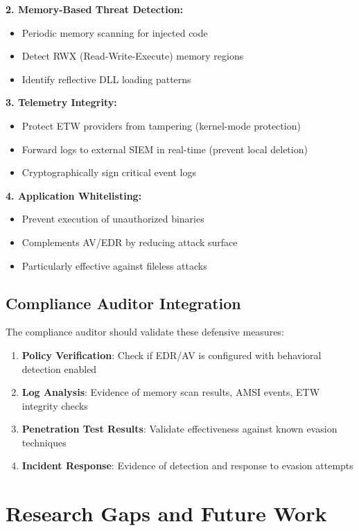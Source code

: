 \documentclass[11pt,conference]{IEEEtran}
\begin{document}
\textbf{2. Memory-Based Threat Detection:}
\begin{itemize}
    \item Periodic memory scanning for injected code
    \item Detect RWX (Read-Write-Execute) memory regions
    \item Identify reflective DLL loading patterns
\end{itemize}

\textbf{3. Telemetry Integrity:}
\begin{itemize}
    \item Protect ETW providers from tampering (kernel-mode protection)
    \item Forward logs to external SIEM in real-time (prevent local deletion)
    \item Cryptographically sign critical event logs
\end{itemize}

\textbf{4. Application Whitelisting:}
\begin{itemize}
    \item Prevent execution of unauthorized binaries
    \item Complements AV/EDR by reducing attack surface
    \item Particularly effective against fileless attacks
\end{itemize}

\subsection{Compliance Auditor Integration}

The compliance auditor should validate these defensive measures:

\begin{enumerate}
    \item \textbf{Policy Verification}: Check if EDR/AV is configured with behavioral detection enabled
    \item \textbf{Log Analysis}: Evidence of memory scan results, AMSI events, ETW integrity checks
    \item \textbf{Penetration Test Results}: Validate effectiveness against known evasion techniques
    \item \textbf{Incident Response}: Evidence of detection and response to evasion attempts
\end{enumerate}

\section{Research Gaps and Future Work}
\end{document}
